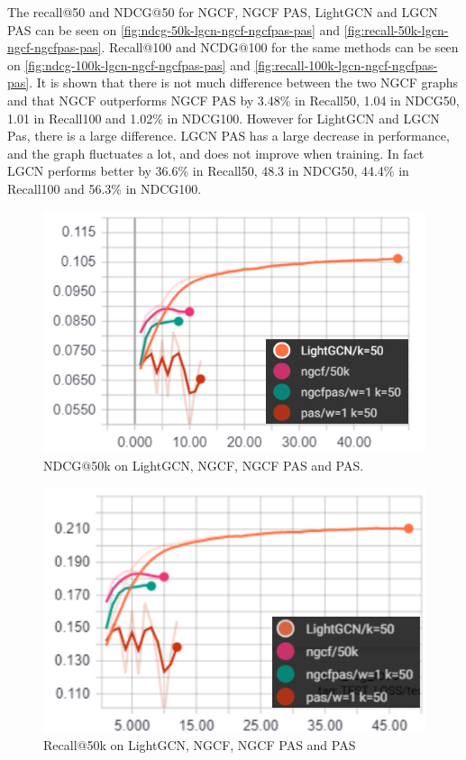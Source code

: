 The recall@50 and NDCG@50 for NGCF, NGCF PAS, LightGCN and LGCN PAS can be seen on \autoref{fig:ndcg-50k-lgcn-ngcf-ngcfpas-pas} and \autoref{fig:recall-50k-lgcn-ngcf-ngcfpas-pas}.
Recall@100 and NCDG@100 for the same methods can be seen on \autoref{fig:ndcg-100k-lgcn-ngcf-ngcfpas-pas} and \autoref{fig:recall-100k-lgcn-ngcf-ngcfpas-pas}.
It is shown that there is not much difference between the two NGCF graphs and that NGCF outperforms NGCF PAS by 3.48\% in Recall\@50, 1.04 in NDCG\@50, 1.01 in Recall\@100 and 1.02\% in NDCG\@100.
However for LightGCN and LGCN Pas, there is a large difference.
LGCN PAS has a large decrease in performance, and the graph fluctuates a lot, and does not improve when training.
In fact LGCN performs better by 36.6\% in Recall\@50, 48.3 in NDCG\@50, 44.4\% in Recall\@100 and 56.3\% in NDCG\@100.
\begin{figure}
    \includegraphics[width=\linewidth]{figures/graphs/ndcg-50k-lgcn-ngcf-ngcfpas-pas.png}
    \caption{NDCG$@$50k on LightGCN, NGCF, NGCF PAS and PAS.}
    \label{fig:ndcg-50k-lgcn-ngcf-ngcfpas-pas}
\end{figure}

\begin{figure}
    \includegraphics[width=\linewidth]{figures/graphs/recall-50k-lgcn-ngcf-ngcfpas-pas.png}
    \caption{Recall$@$50k on LightGCN, NGCF, NGCF PAS and PAS}
    \label{fig:recall-50k-lgcn-ngcf-ngcfpas-pas}
\end{figure}

